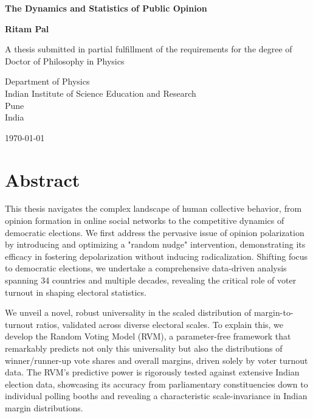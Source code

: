 \begin{titlepage}
\begin{center}

\vspace*{1cm}

\Huge
\textbf{The Dynamics and Statistics of Public Opinion}

\vspace{0.5cm}
\LARGE


\vspace{1.5cm}

\textbf{Ritam Pal}

\vfill

A thesis submitted in partial fulfillment of the requirements for the degree of\\
Doctor of Philosophy in Physics

\vspace{0.8cm}


\Large
Department of Physics\\
Indian Institute of Science Education and Research\\
Pune\\
India

\vspace{0.8cm}

\Large
\today

\end{center}
\end{titlepage}

\newpage

\chapter*{Abstract}

This thesis navigates the complex landscape of human collective behavior, from opinion formation in online social networks to the competitive dynamics of democratic elections. We first address the pervasive issue of opinion polarization by introducing and optimizing a "random nudge" intervention, demonstrating its efficacy in fostering depolarization without inducing radicalization. Shifting focus to democratic elections, we undertake a comprehensive data-driven analysis spanning 34 countries and multiple decades, revealing the critical role of voter turnout in shaping electoral statistics. 

We unveil a novel, robust universality in the scaled distribution of margin-to-turnout ratios, validated across diverse electoral scales. To explain this, we develop the Random Voting Model (RVM), a parameter-free framework that remarkably predicts not only this universality but also the distributions of winner/runner-up vote shares and overall margins, driven solely by voter turnout data. The RVM's predictive power is rigorously tested against extensive Indian election data, showcasing its accuracy from parliamentary constituencies down to individual polling booths and revealing a characteristic scale-invariance in Indian margin distributions. 


